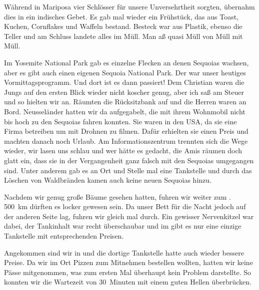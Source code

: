 Während in Mariposa vier Schlösser für unsere Unversehrtheit sorgten, übernahm dies in  ein indisches Gebet.
Es gab mal wieder ein Frühstück, das aus Toast, Kuchen, Cornflakes und Waffeln bestand.
Besteck war aus Plastik, ebenso die Teller und am Schluss landete alles im Müll.
Man aß quasi Müll von Müll mit Müll.

Im Yosemite National Park gab es einzelne Flecken an denen Sequoias wachsen, aber es gibt auch einen eigenen Sequoia National Park.
Der war unser heutiges Vormittagsprogramm.
Und dort ist es dann passiert!
Dem Christian waren die Jungs auf den ersten Blick wieder nicht koscher genug, aber ich saß am Steuer und so hielten wir an.
Räumten die Rücksitzbank auf und die Herren waren an Bord.
Neusseländer hatten wir da aufgegabelt, die mit ihrem Wohnmobil nicht bis hoch zu den Sequoias fahren konnten.
Sie waren in den USA, da sie eine Firma betreiben um mit Drohnen zu filmen.
Dafür erhielten sie einen Preis und machten danach noch Urlaub.
Am Informationszentrum trennten sich die Wege wieder, wir lasen uns schlau und wer hätte es gedacht, die Amis räumen doch glatt ein, dass sie in der Vergangenheit ganz falsch mit den Sequoias umgegangen sind.
Unter anderem gab es an Ort und Stelle mal eine Tankstelle und durch das Löschen von Waldbränden kamen auch keine neuen Sequoias hinzu.

Nachdem wir genug große Bäume gesehen hatten, fuhren wir weiter zum .
500~km dürften es locker gewesen sein.
Da unser Bett für die Nacht jedoch auf der anderen Seite lag, fuhren wir gleich mal durch.
Ein gewisser Nervenkitzel war dabei, der Tankinhalt war recht überschaubar und im  gibt es nur eine einzige Tankstelle mit entsprechenden Preisen.

Angekommen sind wir in  und die dortige Tankstelle hatte auch wieder bessere Preise.
Da wir im Ort Pizzen zum Mitnehmen bestellen wollten, hatten wir keine Pässe mitgenommen, was zum ersten Mal überhaupt kein Problem darstellte.
So konnten wir die Wartezeit von 30~Minuten mit einem guten Hellen überbrücken.

\newpage
\thispagestyle{empty}
\newpage



